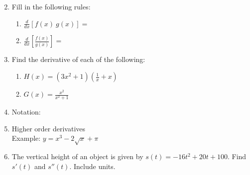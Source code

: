 \documentclass[11pt,fleqn]{article}
\begin{document}
\begin{enumerate}
\begin{multicols}{2}
\begin{enumerate}
	\end{enumerate}
	\end{multicols}
\item Fill in the following rules:\\
	\begin{multicols}{2}
	\begin{enumerate}
	\item $\displaystyle{\frac{d}{dx}\left[f(x)\: g(x)\right]=}$\\

	\item $\displaystyle{\frac{d}{dx}\left[\frac{f(x)}{g(x)}\right]=}$\\

	\end{enumerate}
	\end{multicols}
	
\item Find the derivative of each of the following:
	\begin{enumerate}
	\item $H(x)=(3x^2+1)(\frac{1}{x}+x)$
	\vfill
	\item $G(x)=\frac{x^2}{x^2+1}$
	\vfill
	\end{enumerate}
\newpage
\item Notation:
\vspace{1in}
\item Higher order derivatives\\

Example: $y=x^3-2\sqrt{x}+ \pi$
\vspace{2in}
\item The vertical height of an object is given by $s(t)=-16t^2+20t+100.$ Find $s'(t)$ and $s''(t)$. Include units.
\vspace{2in}
\end{enumerate}
\end{document}
